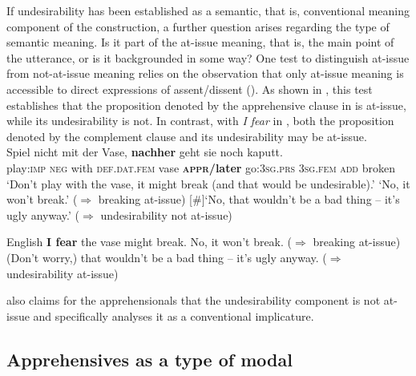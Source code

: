 \documentclass[output=paper,colorlinks,citecolor=brown]{langscibook}
\begin{document}
 If undesirability has been established as a semantic, that is, conventional meaning component of the construction, a further question arises regarding the type of semantic meaning. Is it part of the at-issue meaning, that is, the main point of the utterance, or is it backgrounded in some way? One test to distinguish at-issue from not-at-issue meaning  relies on the observation that only at-issue meaning is accessible to direct expressions of assent/dissent (\cite{faller2002,papafragou2006,tonhauser2012,murray2021}). As shown in , this test establishes that the proposition denoted by the apprehensive clause in  is at-issue, while its undesirability is not. In contrast, with \textit{I fear} in , both the proposition denoted by the complement clause and its undesirability may be at-issue.
\newpage
\ea \label{ex:intro18} 
\\
\gll Spiel nicht mit der Vase, \textbf{nachher} geht sie noch kaputt. \\
play:\textsc{imp} \textsc{neg} with \textsc{def.dat.fem} vase \textsc{\textbf{appr/}}\textbf{later} go:\textsc{3sg.prs} \textsc{3sg.fem} \textsc{add} broken \\
\glt `Don't play with the vase, it might break (and that would be undesirable).'
 `No, it won't break.' ($\Rightarrow$ breaking at-issue)
[\#]{`No, that wouldn't be a bad thing -- it's ugly anyway.' ($\Rightarrow$ undesirability not at-issue)}
\z


\ea \label{ex:intro19} \textnormal{English}
 \textbf{I fear} the vase might break.
 No, it won't break. (\textnormal{$\Rightarrow$ breaking at-issue})
 (Don't worry,) that wouldn't be a bad thing -- it's ugly anyway. (\textnormal{$\Rightarrow$ undesirability at-issue})
\z


\noindent \citet{chapters/francez} also claims for the  apprehensionals that the undesirability component is not at-issue and specifically analyses it as a conventional implicature.


\subsection{Apprehensives as a type of modal}
\label{subsec:modal}
\end{document}
